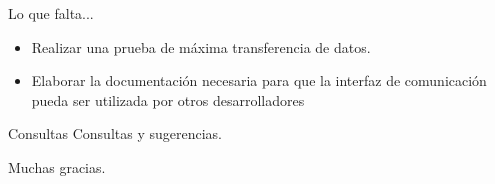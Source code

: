 \begin{frame}{Lo que falta...}
	\begin{itemize}
		\item Realizar una prueba de máxima transferencia de datos.
		\item Elaborar la documentación necesaria para que la interfaz de comunicación pueda ser utilizada por otros desarrolladores
	\end{itemize}
\end{frame}
\begin{frame}{Consultas}
	Consultas y sugerencias.
\end{frame}
\begin{frame}[c]
	\centering
	\alert {Muchas gracias.}
\end{frame}
